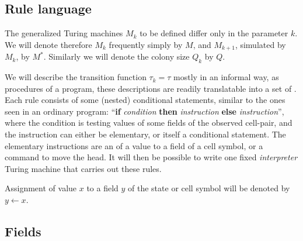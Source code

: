 \documentclass[11pt]{memoir}
\theoremstyle{definition} %
\newcommand{\fld}[1]{\ensuremath{\textit{#1\/}}}
\newcommand{\Q}{Q} %
\newcommand{\increment}[1]{#1\mathord{+}\mathord{+}}
\newcommand{\decrement}[1]{#1\mathord{-}\mathord{-}}
\newcommand{\Addr}{\fld{Addr}}
\newcommand{\Drift}{\fld{Drift}}
\begin{document}
\subsection{Rule language}\label{sec:language}

The generalized Turing machines \( M_{k} \) to be defined
differ only in the parameter \( k \).
We will denote therefore \( M_{k} \) frequently simply by \( M \),
and \( M_{k+1} \), simulated by \( M_{k} \),  by \( M^{*} \).
Similarly we will denote the colony size \( \Q_{k} \) by \( \Q \).

We will describe the transition function
\( \tau_{k}=\tau \)  mostly in an informal way, as procedures of a program,
these descriptions are readily translatable into a set of .
Each rule consists of some (nested) conditional statements,
similar to the ones seen in an ordinary program:
 ``\textbf{if} \textit{condition} \textbf{then} \textit{instruction}
\textbf{else} \textit{instruction}'', 
where the condition is testing values of some fields of the observed cell-pair, and
the instruction can either be elementary, or itself a conditional statement. 
The elementary instructions are an  of a value to a field
of a cell symbol, or a command to move the head.
It will then be possible to write one fixed \emph{interpreter} Turing machine that carries
out these rules.

Assignment of value \( x \) to a field \( y \) of the state or cell symbol will
be denoted by \( y \gets x \).



\subsection{Fields}\label{sec:fields}

\end{document}
